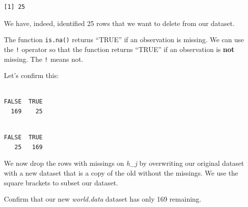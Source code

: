 \documentclass[]{article}
\newenvironment{Shaded}{\begin{snugshade}}{\end{snugshade}}
\newcommand{\KeywordTok}[1]{\textcolor[rgb]{0.13,0.29,0.53}{\textbf{#1}}}
\newcommand{\StringTok}[1]{\textcolor[rgb]{0.31,0.60,0.02}{#1}}
\newcommand{\CommentTok}[1]{\textcolor[rgb]{0.56,0.35,0.01}{\textit{#1}}}
\newcommand{\OperatorTok}[1]{\textcolor[rgb]{0.81,0.36,0.00}{\textbf{#1}}}
\newcommand{\NormalTok}[1]{#1}
\theoremstyle{definition}
\theoremstyle{definition}
\theoremstyle{definition}
\theoremstyle{remark}
\begin{document}
\begin{verbatim}
[1] 25
\end{verbatim}

We have, indeed, identified 25 rows that we want to delete from our
dataset.

The function \texttt{is.na()} returns ``TRUE'' if an observation is
missing. We can use the \texttt{!} operator so that the function returns
``TRUE'' if an observation is \textbf{not} missing. The \texttt{!} means
not.

Let's confirm this:

\begin{Shaded}
\end{Shaded}

\begin{verbatim}

FALSE  TRUE 
  169    25 
\end{verbatim}

\begin{Shaded}
\end{Shaded}

\begin{verbatim}

FALSE  TRUE 
   25   169 
\end{verbatim}

We now drop the rows with missings on \emph{h\_j} by overwriting our
original dataset with a new dataset that is a copy of the old without
the missings. We use the square brackets to subset our dataset.

\begin{Shaded}
\end{Shaded}

Confirm that our new \emph{world.data} dataset has only 169 remaining.
\end{document}
